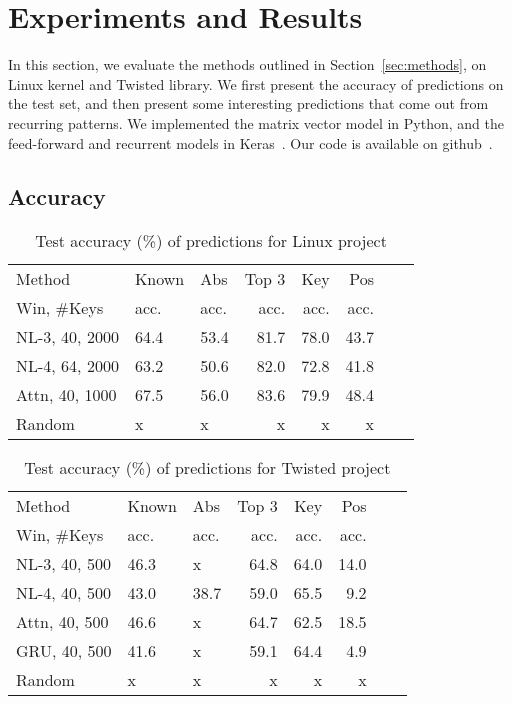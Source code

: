 \section{Experiments and Results}
\label{sec:results}

In this section, we evaluate the methods outlined in Section~\ref{sec:methods},
on Linux kernel and Twisted library. We first present the accuracy of
predictions on the test set, and then present some interesting predictions that
come out from recurring patterns. We implemented the matrix vector model in
Python, and the feed-forward and recurrent models in Keras~\cite{ref:keras}.
Our code is available on github~\cite{ref:codecompletion}.

\subsection{Accuracy}
\label{sec:accuracy}

\begin{table}[h]
  \centering
  \small {
  \begin{tabular}{l l l r r r r r}
    \hline
    Method & Known & Abs & Top 3 & Key & Pos \\
    Win, \#Keys & acc. & acc. & acc.  & acc. & acc. \\
    \hline
    NL-3, 40, 2000 & 64.4 & 53.4 & 81.7 & 78.0 & 43.7\\
    NL-4, 64, 2000 & 63.2 & 50.6 & 82.0 & 72.8 & 41.8\\
    Attn, 40, 1000 & 67.5 & 56.0 & 83.6 & 79.9 & 48.4\\
    Random & x & x & x & x & x\\
    \hline
  \end{tabular}
  }
  \caption{Test accuracy (\%) of predictions for Linux project}
  \label{tab:linux}
\end{table}

\begin{table}[h]
  \centering
  \small {
  \begin{tabular}{l l l r r r r r}
    \hline
    Method & Known & Abs & Top 3 & Key & Pos \\
    Win, \#Keys & acc. & acc. & acc.  & acc. & acc. \\
    \hline
    NL-3, 40, 500 & 46.3 & x & 64.8 & 64.0 & 14.0\\
    NL-4, 40, 500 & 43.0 & 38.7 & 59.0 & 65.5 & 9.2\\
    Attn, 40, 500 & 46.6 & x & 64.7 & 62.5 & 18.5\\
    GRU, 40, 500 & 41.6 & x & 59.1 & 64.4 & 4.9\\
    Random & x & x & x & x & x\\
    \hline
  \end{tabular}
  }
  \caption{Test accuracy (\%) of predictions for Twisted project}
  \label{tab:twisted}
\end{table}

